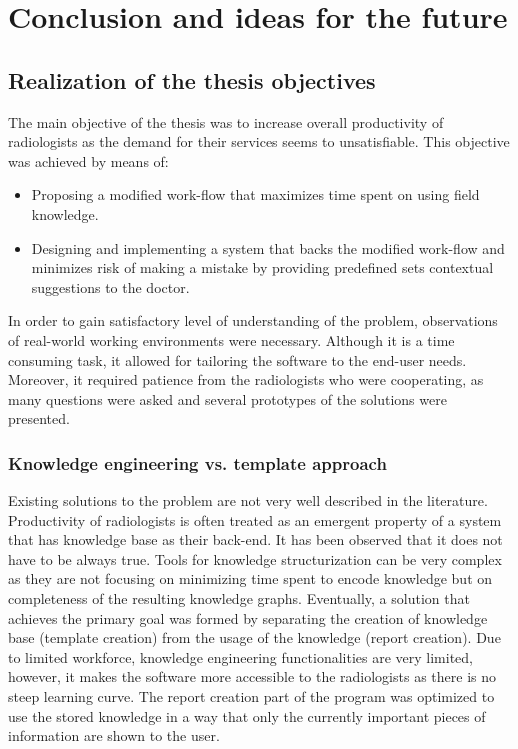 \documentclass[12pt, twoside, openany]{report}
\theoremstyle{definition}
\begin{document}
\chapter{Conclusion and ideas for the future}
\section{Realization of the thesis objectives}
The main objective of the thesis was to increase overall productivity of radiologists as the demand for their services seems to unsatisfiable. This objective was achieved by means of:
\begin{itemize}
	\item Proposing a modified work-flow that maximizes time spent on using field knowledge.
	\item Designing and implementing a system that backs the modified work-flow and minimizes risk of making a mistake by providing predefined sets contextual suggestions to the doctor.
\end{itemize}
In order to gain satisfactory level of understanding of the problem, observations of real-world working environments were necessary. Although it is a time consuming task, it allowed for tailoring the software to the end-user needs. Moreover, it required patience from the radiologists who were cooperating, as many questions were asked and several prototypes of the solutions were presented. 

\subsection{Knowledge engineering  vs. template approach}
Existing solutions to the problem are not very well described in the literature. Productivity of radiologists is often treated as an emergent property of a system that has knowledge base as their back-end. It has been observed that it does not have to be always true. Tools for knowledge structurization can be very complex as they are not focusing on minimizing time spent to encode knowledge but on completeness of the resulting knowledge graphs. 
Eventually, a solution that achieves the primary goal was formed by separating the creation of knowledge base (template creation) from the usage of the knowledge (report creation). Due to limited workforce, knowledge engineering functionalities are very limited, however, it makes the software more accessible to the radiologists as there is no steep learning curve. The report creation part of the program was optimized to use the stored knowledge in a way that only the currently important pieces of information are shown to the user.
\end{document}
